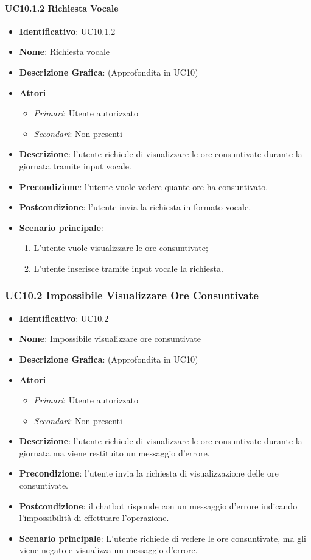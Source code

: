 \paragraph{UC10.1.2 Richiesta Vocale}
\begin{itemize}
	\item \textbf{Identificativo}: UC10.1.2
	\item \textbf{Nome}: Richiesta vocale
	\item \textbf{Descrizione Grafica}: (Approfondita in UC10)
	\item \textbf{Attori}
	\begin{itemize}
		\item \textit{Primari}: Utente autorizzato
		\item \textit{Secondari}: Non presenti
	\end{itemize}
	\item \textbf{Descrizione}: l'utente richiede di visualizzare le ore consuntivate durante la giornata tramite input vocale.
	\item \textbf{Precondizione}: l'utente vuole vedere quante ore ha consuntivato.
	\item \textbf{Postcondizione}: l'utente invia la richiesta in formato vocale.
	\item \textbf{Scenario principale}: 
	\begin{enumerate}
		\item L'utente vuole visualizzare le ore consuntivate;
		\item L'utente inserisce tramite input vocale la richiesta.
	\end{enumerate}
\end{itemize}

\subsubsection{UC10.2 Impossibile Visualizzare Ore Consuntivate}
\begin{itemize}
	\item \textbf{Identificativo}: UC10.2
	\item \textbf{Nome}: Impossibile visualizzare ore consuntivate
	\item \textbf{Descrizione Grafica}: (Approfondita in UC10)
	\item \textbf{Attori}
	\begin{itemize}
		\item \textit{Primari}: Utente autorizzato
		\item \textit{Secondari}: Non presenti
	\end{itemize}
	\item \textbf{Descrizione}: l'utente richiede di visualizzare le ore consuntivate durante la giornata ma viene restituito un messaggio d'errore.
	\item \textbf{Precondizione}: l'utente invia la richiesta di visualizzazione delle ore consuntivate.
	\item \textbf{Postcondizione}: il chatbot risponde con un messaggio d'errore indicando l'impossibilità di effettuare l'operazione.
	\item \textbf{Scenario principale}: L'utente richiede di vedere le ore consuntivate, ma gli viene negato e visualizza un messaggio d'errore.
\end{itemize}
\newpage